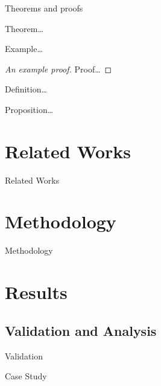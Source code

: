 \begin{frame}{Theorems and proofs}
  \pause
  \begin{theorem}
    Theorem\dots
  \end{theorem}

  \pause
  \begin{example}
    Example\dots
  \end{example}

  \pause
  \begin{proof}[An example proof]
    Proof\dots
  \end{proof}

  \pause
  \begin{definition}
    Definition\dots
  \end{definition}

  \pause
  \begin{proposition}
    Proposition\dots
  \end{proposition}
\end{frame}

\section{Related Works}

\begin{frame}{Related Works}
\end{frame}

\section{Methodology}

\begin{frame}{Methodology}
\end{frame}

\section{Results}

\subsection{Validation and Analysis}

\begin{frame}{Validation}
\end{frame}

\begin{frame}{Case Study}
\end{frame}

